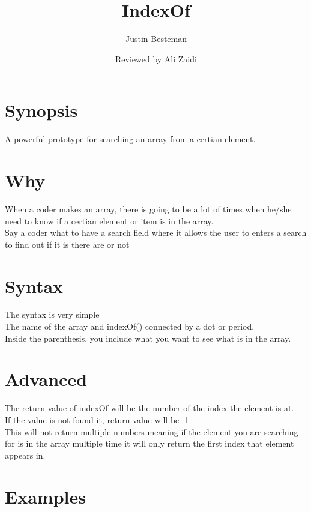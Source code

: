 \documentclass[12pt, letterpaper]{article}
\title{IndexOf}
\author{Justin Besteman}
\date{Reviewed by Ali Zaidi}
\begin{document}
\maketitle


\section*{Synopsis}

A powerful prototype for searching an array from a certian element.

\section*{Why}

When a coder makes an array, there is going to be a lot of times when he/she need to know if a certian  element or item is in the array. \\
Say a coder what to have a search field where it allows the user to enters a search to find out if it is there are or not

\section*{Syntax}

The syntax is very simple \\
The name of the array and indexOf() connected by a dot or period.\\
Inside the parenthesis, you include what you want to see what is in the array.

\section*{Advanced}

The return value of indexOf will be the number of the index the element is at.\\
If the value is not found it, return value will be -1.\\
This will not return multiple numbers meaning if the element you are searching for is in the array multiple time it will only return the first index that element appears in.


\section*{Examples}
\end{document}
